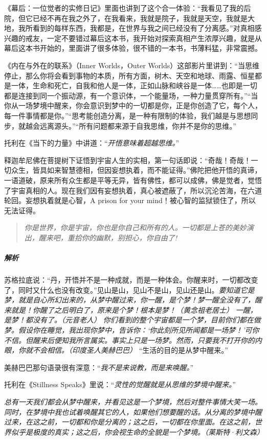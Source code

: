 《幕后：一位觉者的实修日记》里面也讲到了这个合一体验：“我看见了我的后院，但它已经不再在我之外了，在我看来，我就是院子，我就是天空，我就是大地，我所看到的每样东西，我都是，在世界与我之间已经没有了分离感。”对真相感兴趣的戒友，一定不要错过幕后这本书，我开始对探索真相产生浓厚兴趣，就是从幕后这本书开始的，里面讲了很多体验，很不错的一本书，书薄料猛，非常震撼。

《内在与外在的联系》（Inner Worlds，Outer Worlds）这部影片里讲到：“当思维停止，那么你将会看到事物的本质，所有方面，树木、天空和地球、雨露、恒星都是一体，生命和死亡，自我和他人是一体，正如山脉和峡谷是一体……也即是一切都是连接到同一个振动源，有一个意识体，一个能量场，一种力量贯穿所有。”“当你从一场梦境中醒来，你会意识到梦中的一切都是你，正是你创造了它，每个人，每一件事情都是你。”“思考能创造分离，是一种有限制的体验，我们越是与思想同步，就越会远离源头。”“所有问题都来源于自我思维，你并不是你的思维。”

托利在《当下的力量》中讲道：“\textit{开悟意味着超越思维。}”

释迦牟尼佛在菩提树下证悟到宇宙人生的实相，第一句话即说：“奇哉！奇哉！一切众生，皆具如来智慧德相，但因妄想执着，而不能证得。”佛陀把他开悟的真谛，一语道破，原来所有众生都是平等无异，皆有佛性，都可以成佛，佛是觉者，觉悟了宇宙真相的人。现在我们因有妄想执着，真心被遮蔽了，所以沉沦苦海，在六道轮回。妄想执着就是心智，A prison for your mind！被心智的监狱锁住了，所以无法证得。

\begin{quote}\it
    你是世界，你是宇宙，你也是你自己和所有的人。一切都是上苍的美妙演出，醒来吧，重拾你的幽默，别担心，你自由了!
\end{quote}

\subparagraph{解析} 苏格拉底说：“丹，开悟并不是一种成就，而是一种体会。你醒来时，一切都改变了，同时又什么也没有改变。”见山是山，见山不是山，见山还是山。\textit{要知道它是梦，就是自心所幻出来的，从梦中醒过来，你一醒，是个梦！梦一醒全没有了，醒来就是！你醒了之后明白了，原来是个梦！根本是梦！（黄念祖老居士）} \textit{一醒，是梦！都没有了。（元音老人）} \textit{你们看到的整个宇宙都是一个梦，目前你们都在做梦。假设你在睡觉，我出现你梦中，告诉你：‘你此刻所见所闻都是一场梦！’可你不信。但醒来后便知我所言属实。事实上只是一场梦。然而，只要我不打开你的内眼，你就不会相信。（印度圣人美赫巴巴）} “生活的目的是从梦中醒来。”

美赫巴巴那句语录很有深意：“\textit{我不是来说教，而是来唤醒。}”

托利在《Stillness Speaks》里说：“\textit{灵性的觉醒就是从思维的梦境中醒来。}”

\textit{总有一天我们都会从梦中醒来，并看见这是一个梦境，然后对整件事情大笑一场。同时，在梦境中我也试着唤醒其它的人，如果他们想要醒的话。从分离的梦境中醒过来，在这之前，一切都和你是分离的；这之后，一切都在你里面。在这之前，世界似乎是极度的真实；这之后，你会视生命的全貌是一个梦境。（莱斯特·利文森）}

